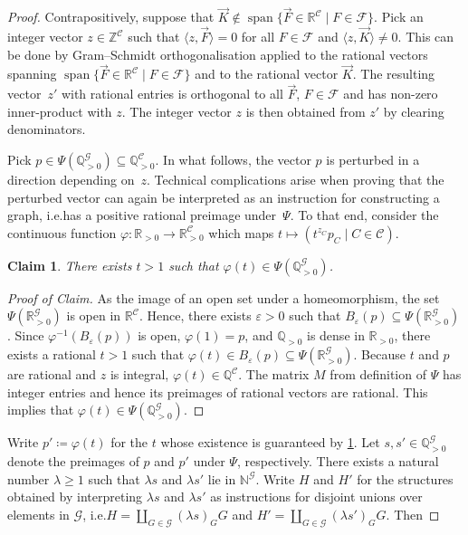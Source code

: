 \documentclass[3p,final]{elsarticle}
\DeclareMathOperator{\spn}{span}
\renewcommand\phi\varphi
\newtheorem{claim}{Claim}[theorem]
\newenvironment{claimproof}[1][Proof of Claim]{\begin{proof}[#1] \renewcommand{\qedsymbol}{$\lrcorner$}}{ \end{proof}}
\renewcommand\epsilon\varepsilon
\begin{document}
\begin{proof}
		Contrapositively, suppose that $\vec{K} \not\in \spn \{\vec{F} \in \mathbb{R}^{\mathcal{C}} \mid F \in \mathcal{F}\}$.
		Pick an integer vector $z \in \mathbb{Z}^{\mathcal{C}}$ such that $\langle z, \vec{F} \rangle = 0$ for all $F \in \mathcal{F}$ and $\langle z, \vec{K} \rangle \neq 0$.
		This can be done by Gram--Schmidt orthogonalisation applied to the rational vectors spanning $\spn \{\vec{F} \in \mathbb{R}^{\mathcal{C}} \mid F \in \mathcal{F}\}$ and to the rational vector $\vec{K}$.
		The resulting vector~$z'$ with rational entries is orthogonal to all $\vec{F}$, $F \in \mathcal{F}$ and has non-zero inner-product with $z$. The integer vector $z$ is then obtained from $z'$ by clearing denominators.
		
		Pick $p \in \Psi(\mathbb{Q}^\mathcal{G}_{>0}) \subseteq \mathbb{Q}^\mathcal{C}_{>0}$. 
		In what follows, the vector $p$ is perturbed in a direction depending on~$z$. Technical complications arise when proving that the perturbed vector can again be interpreted as an instruction for constructing a graph, i.e.\@ has a positive rational preimage under~$\Psi$.
		To that end, consider the continuous function $\phi \colon \mathbb{R}_{>0} \to \mathbb{R}_{>0}^\mathcal{C}$ which maps $t \mapsto (t^{z_C} p_C \mid C \in \mathcal{C})$. 
		\begin{claim} \label{thm:kwiecien22-claim1}
			There exists $t > 1$ such that $\phi(t) \in \Psi(\mathbb{Q}^\mathcal{G}_{>0})$.
		\end{claim}
		\begin{claimproof}
			As the image of an open set under a homeomorphism, the set $\Psi(\mathbb{R}^\mathcal{G}_{>0})$ is open in $\mathbb{R}^{\mathcal{C}}$.
			Hence, there exists $\epsilon > 0$ such that $B_\epsilon(p) \subseteq \Psi(\mathbb{R}^\mathcal{G}_{>0})$.
			Since $\phi^{-1}(B_\epsilon(p))$ is open, $\phi(1) = p$, and $\mathbb{Q}_{>0}$ is dense in $\mathbb{R}_{>0}$, there exists a rational $t > 1$ such that $\phi(t) \in B_\epsilon(p) \subseteq \Psi(\mathbb{R}^\mathcal{G}_{>0})$.
			Because $t$ and $p$ are rational and $z$ is integral, $\phi(t) \in \mathbb{Q}^{\mathcal{C}}$. The matrix $M$ from definition of $\Psi$ has integer entries and hence its preimages of rational vectors are rational. This implies that $\phi(t) \in \Psi(\mathbb{Q}_{> 0}^{\mathcal{G}})$.
		\end{claimproof}
		Write $p' \coloneqq \phi(t)$ for the $t$ whose existence is guaranteed by \cref{thm:kwiecien22-claim1}.
		Let $s, s' \in \mathbb{Q}_{> 0}^{\mathcal{G}}$ denote the preimages of $p$ and $p'$ under $\Psi$, respectively. There exists a natural number $\lambda \geq 1$ such that $\lambda s$ and $\lambda s'$ lie in $\mathbb{N}^{\mathcal{G}}$. Write $H$ and $H'$ for the structures obtained by interpreting $\lambda s$ and $\lambda s'$ as instructions for disjoint unions over elements in $\mathcal{G}$, i.e.\@ $H = \coprod_{G \in \mathcal{G}} (\lambda s)_G G$ and $H' = \coprod_{G \in \mathcal{G}} (\lambda s')_G G$. Then

\end{proof}
\end{document}
